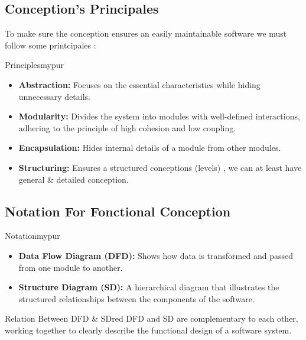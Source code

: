 \subsection{Conception's Principales}To make sure the conception ensures an easily maintainable
software we must follow some printcipales :


\begin{prettyBox}{Principles}{mypur}

\begin{itemize}
    \item \textbf{Abstraction:} Focuses on the essential characteristics while
hiding unnecessary details.
    \item \textbf{Modularity:} Divides the system into modules with well-defined interactions,
adhering to the principle of high cohesion and low coupling.
    \item \textbf{Encapsulation:} Hides internal details of a module from other modules.
    \item \textbf{Structuring:} Ensures a structured conceptions (levels) , we can at least have general \& detailed conception.
\end{itemize}

\end{prettyBox}

\vspace{0.5cm}

\subsection{Notation For Fonctional Conception}


\begin{prettyBox}{Notation}{mypur}
\begin{itemize}
    \item \textbf{Data Flow Diagram (DFD):} Shows how data is transformed and passed from one module to another.
    \item \textbf{Structure Diagram (SD):} A hierarchical diagram that illustrates the structured relationships between the components of the software.
\end{itemize}
\end{prettyBox}


\vspace{0.5cm}

\begin{prettyBox}{Relation Between DFD \& SD}{red}
    DFD and SD are complementary to each other, working together to clearly describe the functional design of a software system.
\end{prettyBox}

